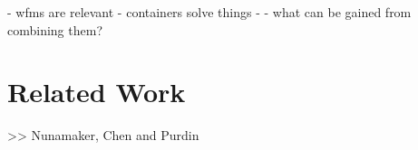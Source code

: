 
  - wfms are relevant
  - containers solve things
  -
  - what can be gained from combining them?





\section{Related Work} %
  \label{sec:related_work}




>> Nunamaker, Chen and Purdin


